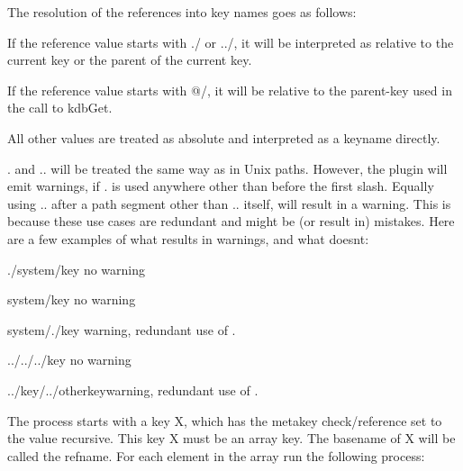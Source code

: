 The resolution of the references into key names goes as follows\+:


\begin{DoxyItemize}
\item If the reference value starts with {\ttfamily ./} or {\ttfamily ../}, it will be interpreted as relative to the current key or the parent of the current key.
\item If the reference value starts with {\ttfamily @/}, it will be relative to the parent-\/key used in the call to {\ttfamily kdb\+Get}.
\item All other values are treated as absolute and interpreted as a keyname directly.
\item {\ttfamily .} and {\ttfamily ..} will be treated the same way as in Unix paths. However, the plugin will emit warnings, if {\ttfamily .} is used anywhere other than before the first slash. Equally using {\ttfamily ..} after a path segment other than {\ttfamily ..} itself, will result in a warning. This is because these use cases are redundant and might be (or result in) mistakes. Here are a few examples of what results in warnings, and what doesn\textquotesingle{}t\+:
\begin{DoxyItemize}
\item {\ttfamily ./system/key} no warning
\item {\ttfamily system/key} no warning
\item {\ttfamily system/./key} warning, redundant use of {\ttfamily .}
\item {\ttfamily ../../../key} no warning
\item {\ttfamily ../key/../otherkey}warning, redundant use of {\ttfamily .}
\end{DoxyItemize}
\end{DoxyItemize}

The process starts with a key {\ttfamily X}, which has the metakey {\ttfamily check/reference} set to the value {\ttfamily recursive}. This key {\ttfamily X} must be an array key. The basename of {\ttfamily X} will be called the {\ttfamily refname}. For each element in the array run the following process\+:



